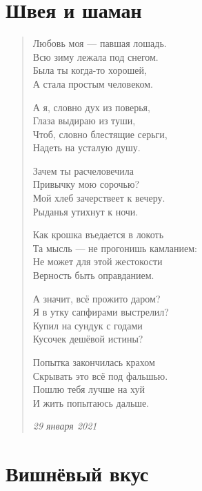 \section{Швея и шаман}

\begin{verse}
Любовь моя --- павшая лошадь. \\
Всю зиму лежала под снегом. \\
Была ты когда-то хорошей, \\
А стала простым человеком.

А я, словно дух из поверья, \\
Глаза выдираю из туши, \\
Чтоб, словно блестящие серьги, \\
Надеть на усталую душу.

Зачем ты расчеловечила \\
Привычку мою сорочью? \\
Мой хлеб зачерствеет к вечеру. \\
Рыданья утихнут к ночи.

Как крошка въедается в локоть \\
Та мысль --- не прогонишь камланием: \\
Не может для этой жестокости \\
Верность быть оправданием.

А значит, всё прожито даром? \\
Я в утку сапфирами выстрелил? \\
Купил на сундук с годами \\
Кусочек дешёвой истины?

Попытка закончилась крахом \\
Скрывать это всё под фальшью. \\
Пошлю тебя лучше на хуй \\
И жить попытаюсь дальше.

\emph{29 января 2021}
\end{verse}
\newpage

\section{Вишнёвый вкус}

